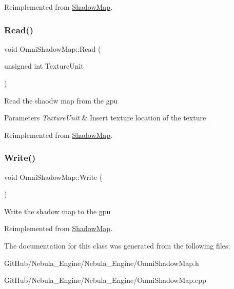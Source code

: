 Reimplemented from \mbox{\hyperlink{class_shadow_map_ad622c961f2cdc0ba2cbe24a759eb690b}{Shadow\+Map}}.

\mbox{\label{class_omni_shadow_map_ae2c39deb32f33b8c6f461f4525a1d552}} 
\subsubsection{\texorpdfstring{Read()}{Read()}}
{\footnotesize\ttfamily void Omni\+Shadow\+Map\+::\+Read (\begin{DoxyParamCaption}\item[{unsigned int}]{Texture\+Unit }\end{DoxyParamCaption})\hspace{0.3cm}{\ttfamily [virtual]}}

Read the shaodw map from the gpu 
\begin{DoxyParams}{Parameters}
{\em Texture\+Unit} & Insert texture location of the texture \\
\hline
\end{DoxyParams}


Reimplemented from \mbox{\hyperlink{class_shadow_map_a6b48e98aeab56d0c9bf4c2ac4beeb3db}{Shadow\+Map}}.

\mbox{\label{class_omni_shadow_map_aafd4e0d6b4cf265b59c67585c35622de}} 
\subsubsection{\texorpdfstring{Write()}{Write()}}
{\footnotesize\ttfamily void Omni\+Shadow\+Map\+::\+Write (\begin{DoxyParamCaption}{ }\end{DoxyParamCaption})\hspace{0.3cm}{\ttfamily [virtual]}}

Write the shadow map to the gpu 

Reimplemented from \mbox{\hyperlink{class_shadow_map_abfaac01d19680e016042dacee5a5910e}{Shadow\+Map}}.



The documentation for this class was generated from the following files\+:\begin{DoxyCompactItemize}
\item 
Git\+Hub/\+Nebula\+\_\+\+Engine/\+Nebula\+\_\+\+Engine/Omni\+Shadow\+Map.\+h\item 
Git\+Hub/\+Nebula\+\_\+\+Engine/\+Nebula\+\_\+\+Engine/Omni\+Shadow\+Map.\+cpp\end{DoxyCompactItemize}
